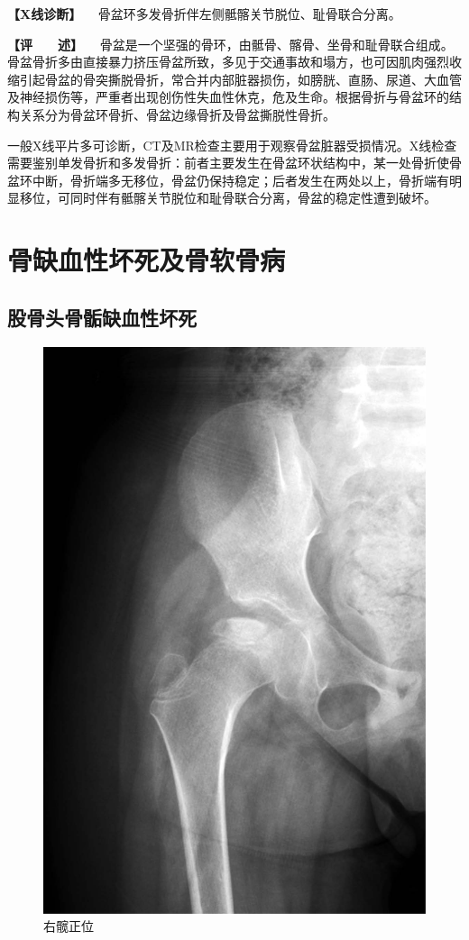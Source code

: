 \textbf{【X线诊断】} 　骨盆环多发骨折伴左侧骶髂关节脱位、耻骨联合分离。

\textbf{【评　　述】}
　骨盆是一个坚强的骨环，由骶骨、髂骨、坐骨和耻骨联合组成。骨盆骨折多由直接暴力挤压骨盆所致，多见于交通事故和塌方，也可因肌肉强烈收缩引起骨盆的骨突撕脱骨折，常合并内部脏器损伤，如膀胱、直肠、尿道、大血管及神经损伤等，严重者出现创伤性失血性休克，危及生命。根据骨折与骨盆环的结构关系分为骨盆环骨折、骨盆边缘骨折及骨盆撕脱性骨折。

一般X线平片多可诊断，CT及MR检查主要用于观察骨盆脏器受损情况。X线检查需要鉴别单发骨折和多发骨折：前者主要发生在骨盆环状结构中，某一处骨折使骨盆环中断，骨折端多无移位，骨盆仍保持稳定；后者发生在两处以上，骨折端有明显移位，可同时伴有骶髂关节脱位和耻骨联合分离，骨盆的稳定性遭到破坏。

\section{骨缺血性坏死及骨软骨病}

\subsection{股骨头骨骺缺血性坏死}

\begin{figure}[!htbp]
 \centering
 \includegraphics{./images/Image00062.jpg}
 \captionsetup{justification=centering}
 \caption{右髋正位}
 \label{fig2-4-1}
  \end{figure} 

